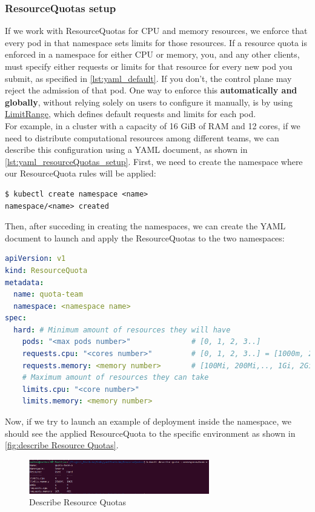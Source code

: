 \subsubsection{ResourceQuotas setup}
\label{subsec:resourceQuotas}
If we work with ResourceQuotas for CPU and memory resources, we enforce that every pod in that namespace sets limits for those resources.
If a resource quota is enforced in a namespace for either CPU or memory, you, and any other clients, must specify either requests or limits for that resource for every new pod you submit, as specified in \autoref{lst:yaml_default}. If you don’t, the control plane may reject the admission of that pod.
One way to enforce this \textbf{automatically and globally}, without relying solely on users to configure it manually, is by using \hyperref[subsec:limitRange]{LimitRange}, which defines default requests and limits for each pod. \\
For example, in a cluster with a capacity of 16 GiB of RAM and 12 cores, if we need to distribute computational resources among different teams, we can describe this configuration using a YAML document, as shown in \autoref{lst:yaml_resourceQuotas_setup}.
First, we need to create the namespace where our ResourceQuota rules will be applied:
\begin{lstlisting}
$ kubectl create namespace <name>
namespace/<name> created
\end{lstlisting}
Then, after succeding in creating the namespaces, we can create the YAML document to launch and apply the ResourceQuotas to the two namespaces:
\begin{lstlisting}[language=yaml, caption={Deployment namespace ResourceQuotas}, label={lst:yaml_resourceQuotas_setup}]
apiVersion: v1
kind: ResourceQuota
metadata:
  name: quota-team
  namespace: <namespace name>
spec:
  hard: # Minimum amount of resources they will have
    pods: "<max pods number>"              # [0, 1, 2, 3..]
    requests.cpu: "<cores number>"         # [0, 1, 2, 3..] = [1000m, 2000m, ...]
    requests.memory: <memory number>       # [100Mi, 200Mi,.., 1Gi, 2Gi..]
    # Maximum amount of resources they can take
    limits.cpu: "<core number>"
    limits.memory: <memory number> 
\end{lstlisting}
Now, if we try to launch an example of deployment inside the namespace, we should see the applied ResourceQuota to the specific environment as shown in \autoref{fig:describe Resource Quotas}.
\begin{figure}[h!]
    \centering
    \includegraphics[width=0.7\textwidth]{images/describe_resource_quota.png}
    \caption{Describe Resource Quotas}
    \label{fig:describe Resource Quotas}
\end{figure}


